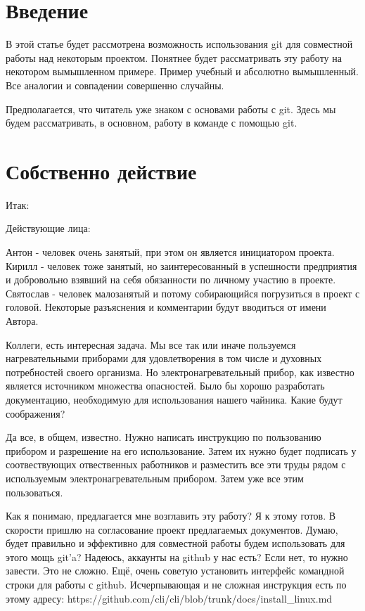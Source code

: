 \documentclass[14pt,a4paper]{article}
\begin{document}
\section{Введение}
В этой статье будет рассмотрена возможность использования git для совместной работы над 
некоторым проектом. Понятнее будет рассматривать эту работу на некотором вымышленном примере. 
Пример учебный и абсолютно вымышленный. Все аналогии и совпадении совершенно случайны.

Предполагается, что читатель уже знаком с основами работы с git. Здесь мы будем рассматривать,
в основном, работу в команде с помощью git.

\section{Собственно действие}
Итак:

Действующие лица:

Антон - человек очень занятый, при этом он является инициатором проекта.
Кирилл - человек тоже занятый, но заинтересованный в успешности предприятия и добровольно
взявший на себя обязанности по личному участию в проекте.
Святослав - человек малозанятый и потому собирающийся погрузиться в проект с головой.
Некоторые разъяснения и комментарии будут вводиться от имени Автора.


 Коллеги, есть интересная задача. Мы все так или иначе пользуемся нагревательными приборами
для удовлетворения в том числе и духовных потребностей своего организма. Но электронагревательный 
прибор, как известно является источником множества опасностей. Было бы хорошо разработать
документацию, необходимую для использования нашего чайника. Какие будут соображения?

 Да все, в общем, известно. Нужно написать инструкцию по пользованию прибором и разрешение
на его использование. 
Затем их нужно будет подписать у соотвествующих отвественных работников и разместить все эти труды
рядом с используемым электронагревательным прибором. Затем уже все этим пользоваться. 

 Как я понимаю, предлагается мне возглавить эту работу? Я к этому готов. В скорости
пришлю на согласование проект предлагаемых документов. Думаю, будет правильно и эффективно
для совместной работы будем использовать для этого мощь git'a? Надеюсь, аккаунты на github у нас есть?
Если нет, то нужно завести. Это не сложно. Ещё, очень советую установить интерфейс командной
строки для работы с github. Исчерпывающая и не сложная инструкция есть по этому адресу:
https://github.com/cli/cli/blob/trunk/docs/install\_linux.md
\end{document}
